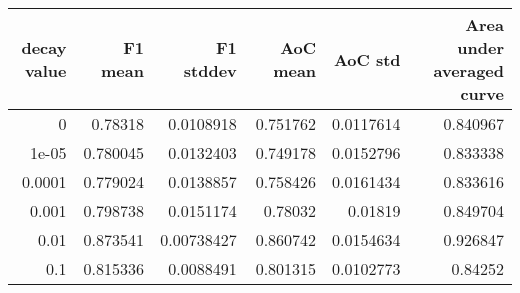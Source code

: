 \begin{tabular}{rrrrrr}
\toprule
   decay value &   F1 mean &   F1 stddev &   AoC mean &   AoC std &   Area under averaged curve \\
\midrule
        0      &  0.78318  &  0.0108918  &   0.751762 & 0.0117614 &                    0.840967 \\
        1e-05  &  0.780045 &  0.0132403  &   0.749178 & 0.0152796 &                    0.833338 \\
        0.0001 &  0.779024 &  0.0138857  &   0.758426 & 0.0161434 &                    0.833616 \\
        0.001  &  0.798738 &  0.0151174  &   0.78032  & 0.01819   &                    0.849704 \\
        0.01   &  0.873541 &  0.00738427 &   0.860742 & 0.0154634 &                    0.926847 \\
        0.1    &  0.815336 &  0.0088491  &   0.801315 & 0.0102773 &                    0.84252  \\
\bottomrule
\end{tabular}